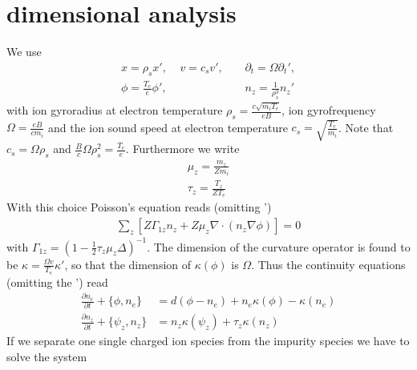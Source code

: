 \documentclass[a4paper,12pt]{scrartcl}
\begin{document}
\section{dimensional analysis}
We use 
\begin{subequations}
    \begin{align}
        x = \rho_s x', \ \ \ \ \  v = c_s v', \ \ \ \ \ 
            &\partial_t = \Omega \partial_t', \\
        \phi = \frac{T_e}{e}\phi',\ \ \ \ \
            &n_z  = \frac{1}{\rho_s^3}n_z'
        \label{}
    \end{align}
    \label{}
\end{subequations}with 
 ion gyroradius at electron temperature $\rho_s = \frac{c\sqrt{m_i T_e}}{eB}$,
 ion gyrofrequency $\Omega = \frac{eB}{cm_i}$ and
the ion sound speed at electron temperature $c_s = \sqrt{\frac{T_e}{m_i}}$. 
Note that $c_s = \Omega \rho_s$
and $\frac{B}{c}\Omega \rho_s^2 = \frac{T_e}{e}$.
Furthermore we write
\begin{subequations}
    \begin{align}
        \mu_z = \frac{m_z}{Zm_i}\\
        \tau_z = \frac{T_z}{ZT_e}
        \label{}
    \end{align}
    \label{}
\end{subequations}
With this choice Poisson's equation reads (omitting ')
\begin{align}
    \sum_z \left[ Z \Gamma_{1z}n_z + Z\mu_z\nabla\cdot(n_z \nabla\phi)\right] = 0
    \label{}
\end{align}
with $\Gamma_{1z} = \left(1-\frac{1}{2}\tau_z\mu_z \Delta\right)^{-1}$. 
The dimension of the curvature operator is found to be
$\kappa = \frac{\Omega e}{T_e}\kappa'$, 
so that the dimension of $\kappa(\phi)$ is $\Omega$.
Thus the continuity equations (omitting the ') read
\begin{subequations}
\begin{align}
    \frac{\partial n_e}{\partial t} + \{\phi, n_e\} &= d( \phi - n_e) + n_e\kappa(\phi) -
    \kappa(n_e) \\
    \frac{\partial n_z}{\partial t} + \{\psi_z, n_z\} &= n_z\kappa(\psi_z) +
    \tau_z\kappa(n_z) 
    \label{}
\end{align}
\end{subequations}
If we separate one single charged ion species from the impurity species we 
have to solve the system
\end{document}
